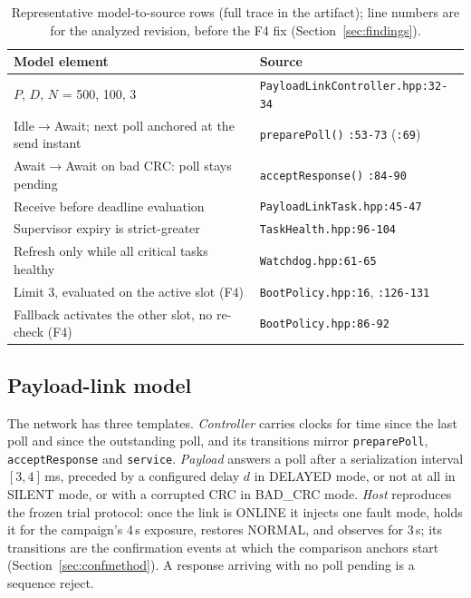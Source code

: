 \documentclass[conference,a4paper]{IEEEtran}
\begin{document}
\begin{table}[t]
\centering\footnotesize
\caption{Representative model-to-source rows (full trace in the artifact); line numbers are for the analyzed revision, before the F4 fix (Section~\ref{sec:findings}).}
\label{tab:trace}
\setlength{\tabcolsep}{3.5pt}
\begin{tabularx}{\columnwidth}{@{}>{\raggedright\arraybackslash}X l@{}}
\toprule
Model element & Source \\
\midrule
$P$, $D$, $N$ = 500, 100, 3 & \texttt{PayloadLinkController.hpp:32-34} \\
Idle$\to$Await; next poll anchored at the send instant & \texttt{preparePoll()} \texttt{:53-73} (\texttt{:69}) \\
Await$\to$Await on bad CRC: poll stays pending & \texttt{acceptResponse()} \texttt{:84-90} \\
Receive before deadline evaluation & \texttt{PayloadLinkTask.hpp:45-47} \\
Supervisor expiry is strict-greater & \texttt{TaskHealth.hpp:96-104} \\
Refresh only while all critical tasks healthy & \texttt{Watchdog.hpp:61-65} \\
Limit 3, evaluated on the active slot (F4) & \texttt{BootPolicy.hpp:16}, \texttt{:126-131} \\
Fallback activates the other slot, no re-check (F4) & \texttt{BootPolicy.hpp:86-92} \\
\bottomrule
\end{tabularx}
\end{table}


\subsection{Payload-link model}
\label{sec:models}
The network has three templates. \emph{Controller} carries clocks for time since the last poll and since the outstanding poll, and its transitions mirror \texttt{preparePoll}, \texttt{acceptResponse} and \texttt{service}. \emph{Payload} answers a poll after a serialization interval $[3,4]$\,ms, preceded by a configured delay $d$ in DELAYED mode, or not at all in SILENT mode, or with a corrupted CRC in BAD\_CRC mode. \emph{Host} reproduces the frozen trial protocol: once the link is ONLINE it injects one fault mode, holds it for the campaign's 4\,s exposure, restores NORMAL, and observes for 3\,s; its transitions are the confirmation events at which the comparison anchors start (Section~\ref{sec:confmethod}). A response arriving with no poll pending is a sequence reject.
\end{document}
